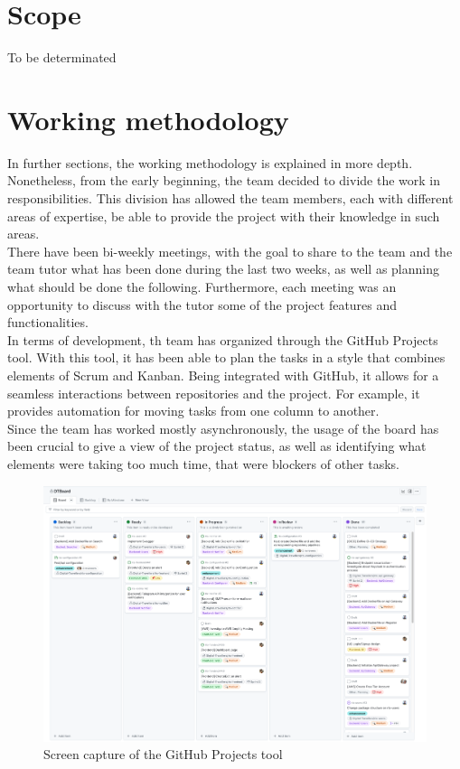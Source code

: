 \documentclass[../memory.tex]{subfiles}
\begin{document}
\section{Scope}
To be determinated
\section{Working methodology}
In further sections, the working methodology is explained in more depth.
Nonetheless, from the early beginning, the team decided to divide the work in
responsibilities. This division has allowed the team members, each with
different areas of expertise, be able to provide the project with their
knowledge in such areas.
\\
There have been bi-weekly meetings, with the goal to share to the team and the
team tutor what has been done during the last two weeks, as well as planning
what should be done the following. Furthermore, each meeting was an opportunity
to discuss with the tutor some of the project features and functionalities.
\\[8pt]
In terms of development, th team has organized through the GitHub Projects tool.
With this tool, it has been able to plan the tasks in a style that combines
elements of Scrum and Kanban. Being integrated with GitHub, it allows for a
seamless interactions between repositories and the project. For example, it
provides automation for moving tasks from one column to another.
\\
Since the team has worked mostly asynchronously, the usage of the board has been
crucial to give a view of the project status, as well as identifying what
elements were taking too much time, that were blockers of other tasks.
\begin{figure}[H]
	\centering
	\includegraphics[width=\textwidth]{./assets/github-projects.png}
	\caption{Screen capture of the GitHub Projects tool}
\end{figure}
\end{document}
